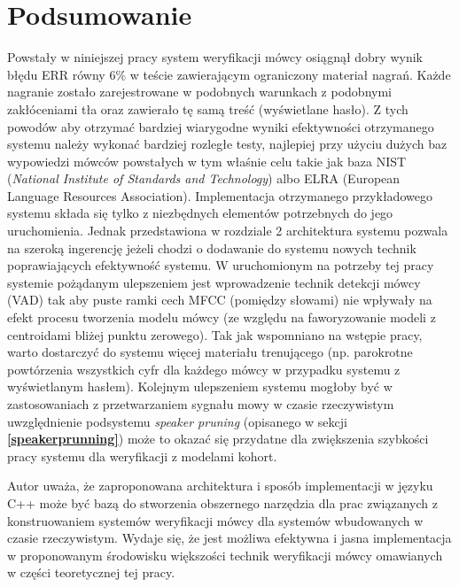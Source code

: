 \chapter{Podsumowanie}

Powstały w niniejszej pracy system weryfikacji mówcy osiągnął dobry wynik błędu ERR równy 6\% w teście zawierającym ograniczony materiał nagrań. Każde nagranie zostało zarejestrowane w podobnych warunkach z podobnymi zakłóceniami tła oraz zawierało tę samą treść (wyświetlane hasło). Z tych powodów aby otrzymać bardziej wiarygodne wyniki efektywności otrzymanego systemu należy wykonać bardziej rozległe testy, najlepiej przy użyciu dużych baz wypowiedzi mówców powstałych w tym właśnie celu takie jak baza NIST (\textit{National Institute of Standards and Technology}) albo ELRA (European Language Resources Association). Implementacja otrzymanego przykładowego systemu składa się tylko z niezbędnych elementów potrzebnych do jego uruchomienia. Jednak przedstawiona w rozdziale 2 architektura systemu pozwala na szeroką ingerencję jeżeli chodzi o dodawanie do systemu nowych technik poprawiających efektywność systemu. W uruchomionym na potrzeby tej pracy systemie pożądanym ulepszeniem jest wprowadzenie technik detekcji mówcy (VAD) tak aby puste ramki cech MFCC (pomiędzy słowami) nie wpływały na efekt procesu tworzenia modelu mówcy (ze względu na faworyzowanie modeli z centroidami bliżej punktu zerowego). Tak jak wspomniano na wstępie pracy, warto dostarczyć do systemu więcej materiału trenującego (np. parokrotne powtórzenia wszystkich cyfr dla każdego mówcy w przypadku systemu z wyświetlanym hasłem). Kolejnym ulepszeniem systemu mogłoby być w zastosowaniach z przetwarzaniem sygnału mowy w czasie rzeczywistym uwzględnienie podsystemu \textit{speaker pruning} (opisanego w sekcji \textbf{\ref{speakerprunning}}) może to okazać się przydatne dla zwiększenia szybkości pracy systemu dla weryfikacji z modelami kohort.

Autor uważa, że zaproponowana architektura i sposób implementacji w języku C++ może być bazą do stworzenia obszernego narzędzia dla prac związanych z konstruowaniem systemów weryfikacji mówcy dla systemów wbudowanych w czasie rzeczywistym. Wydaje się, że jest możliwa efektywna i jasna implementacja w proponowanym środowisku większości technik weryfikacji mówcy omawianych w części teoretycznej tej pracy.
